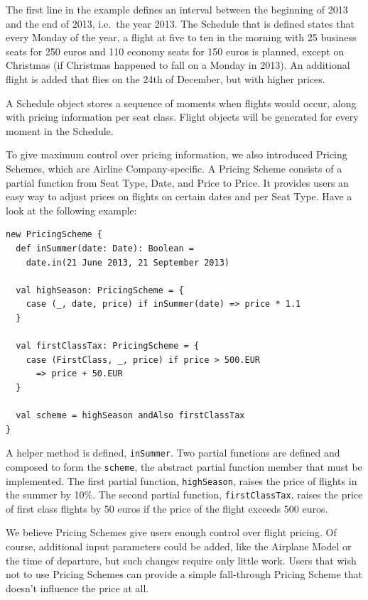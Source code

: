 \documentclass[a4paper]{article}
\renewcommand{\sc}[1]{\lstinline{#1}}
\begin{document}
The first line in the example defines an interval between the beginning of 2013 and the end of 2013, i.e.\ the year 2013.
The Schedule that is defined states that every Monday of the year, a flight at five to ten in the morning with 25 business seats for 250 euros and 110 economy seats for 150 euros is planned, except on Christmas (if Christmas happened to fall on a Monday in 2013).
An additional flight is added that flies on the 24th of December, but with higher prices.

A Schedule object stores a sequence of moments when flights would occur, along with pricing information per seat class.
Flight objects will be generated for every moment in the Schedule.

To give maximum control over pricing information, we also introduced Pricing Schemes, which are Airline Company-specific.
A Pricing Scheme consists of a partial function from Seat Type, Date, and Price to Price.
It provides users an easy way to adjust prices on flights on certain dates and per Seat Type.
Have a look at the following example:

\begin{lstlisting}
new PricingScheme {
  def inSummer(date: Date): Boolean =
    date.in(21 June 2013, 21 September 2013)

  val highSeason: PricingScheme = {
    case (_, date, price) if inSummer(date) => price * 1.1
  }

  val firstClassTax: PricingScheme = {
    case (FirstClass, _, price) if price > 500.EUR
      => price + 50.EUR
  }

  val scheme = highSeason andAlso firstClassTax
}
\end{lstlisting}

A helper method is defined, \sc{inSummer}.
Two partial functions are defined and composed to form the \sc{scheme}, the abstract partial function member that must be implemented.
The first partial function, \sc{highSeason}, raises the price of flights in the summer by 10\%.
The second partial function, \sc{firstClassTax}, raises the price of first class flights by 50 euros if the price of the flight exceeds 500 euros.

We believe Pricing Schemes give users enough control over flight pricing.
Of course, additional input parameters could be added, like the Airplane Model or the time of departure, but such changes require only little work.
Users that wish not to use Pricing Schemes can provide a simple fall-through Pricing Scheme that doesn't influence the price at all.
\end{document}
